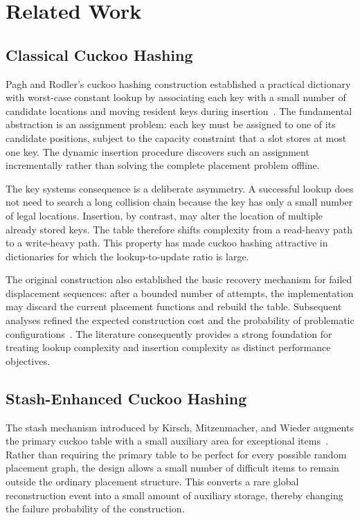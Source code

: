 \documentclass[conference]{IEEEtran}
\begin{document}
\section{Related Work}

\subsection{Classical Cuckoo Hashing}

Pagh and Rodler's cuckoo hashing construction established a practical dictionary with worst-case constant lookup by associating each key with a small number of candidate locations and moving resident keys during insertion~\cite{pagh2004cuckoo}. The fundamental abstraction is an assignment problem: each key must be assigned to one of its candidate positions, subject to the capacity constraint that a slot stores at most one key. The dynamic insertion procedure discovers such an assignment incrementally rather than solving the complete placement problem offline.

The key systems consequence is a deliberate asymmetry. A successful lookup does not need to search a long collision chain because the key has only a small number of legal locations. Insertion, by contrast, may alter the location of multiple already stored keys. The table therefore shifts complexity from a read-heavy path to a write-heavy path. This property has made cuckoo hashing attractive in dictionaries for which the lookup-to-update ratio is large.

The original construction also established the basic recovery mechanism for failed displacement sequences: after a bounded number of attempts, the implementation may discard the current placement functions and rebuild the table. Subsequent analyses refined the expected construction cost and the probability of problematic configurations~\cite{devroye2003cuckoo,drmota2012precise}. The literature consequently provides a strong foundation for treating lookup complexity and insertion complexity as distinct performance objectives.

\subsection{Stash-Enhanced Cuckoo Hashing}

The stash mechanism introduced by Kirsch, Mitzenmacher, and Wieder augments the primary cuckoo table with a small auxiliary area for exceptional items~\cite{kirsch2009stash}. Rather than requiring the primary table to be perfect for every possible random placement graph, the design allows a small number of difficult items to remain outside the ordinary placement structure. This converts a rare global reconstruction event into a small amount of auxiliary storage, thereby changing the failure probability of the construction.
\end{document}
